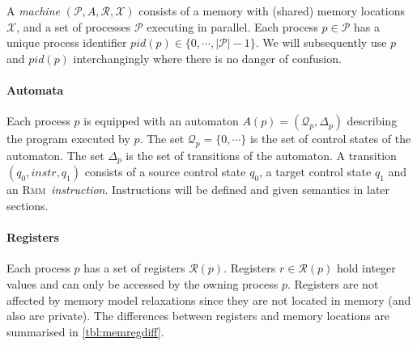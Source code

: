 \documentclass[a4paper]{article}
\newcommand{\rmm}{\textsc{Rmm}}
\begin{document}
\newcommand{\vars}{\mathcal{X}} %
\newcommand{\procs}{\mathcal{P}} %
\newcommand{\automata}{A} %
\newcommand{\pautomaton}[1]{A(#1)} %
\newcommand{\regs}{\mathcal{R}} %
\newcommand{\pregs}[1]{\mathcal{R}(#1)} %
\newcommand{\pcstates}[1]{\mathcal{Q}_{#1}} %
\newcommand{\ptransitions}[1]{\Delta_{#1}} %


A \emph{machine} $(\procs,\automata,\regs,\vars)$ consists of a memory
with (shared) memory locations $\vars$, and a set of processes
$\procs$ executing in parallel. Each process $p\in\procs$ has a unique
process identifier $pid(p) \in \{0,\cdots,|\procs|-1\}$. We will
subsequently use $p$ and $pid(p)$ interchangingly where there is no
danger of confusion.

\paragraph{Automata}
Each process $p$ is equipped with an automaton $\pautomaton{p} =
(\pcstates{p},\ptransitions{p})$ describing the program executed by
$p$. The set $\pcstates{p} = \{0,\cdots\}$ is the set of control
states of the automaton. The set $\ptransitions{p}$ is the set of
transitions of the automaton. A transition $(q_0,instr,q_1)$ consists
of a source control state $q_0$, a target control state $q_1$ and an
\rmm\ \emph{instruction}. Instructions will be defined and given
semantics in later sections.

\paragraph{Registers}
Each process $p$ has a set of registers $\pregs{p}$. Registers
$r\in\pregs{p}$ hold integer values and can only be accessed by the
owning process $p$. Registers are not affected by memory model
relaxations since they are not located in memory (and also are
private). The differences between registers and memory locations are
summarised in \cref{tbl:memregdiff}.
\end{document}
